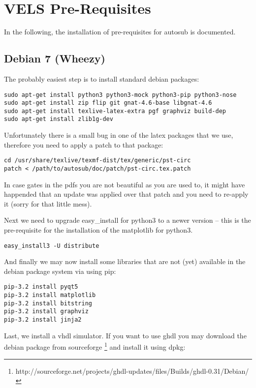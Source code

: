 \section{VELS Pre-Requisites} \label{system_prerequisites}

In the following, the installation of pre-requisites for autosub is documented.

\subsection{Debian 7 (Wheezy)}

The probably easiest step is to install standard debian packages:

\begin{verbatim}
sudo apt-get install python3 python3-mock python3-pip python3-nose
sudo apt-get install zip flip git gnat-4.6-base libgnat-4.6
sudo apt-get install texlive-latex-extra pgf graphviz build-dep
sudo apt-get install zlib1g-dev
\end{verbatim}

Unfortunately there is a small bug in one of the latex packages that we use,
therefore you need to apply a patch to that package:

\begin{verbatim}
cd /usr/share/texlive/texmf-dist/tex/generic/pst-circ
patch < /path/to/autosub/doc/patch/pst-circ.tex.patch
\end{verbatim}

In case gates in the pdfs you are not beautiful as you are used to, it might have
happended that an update was applied over that patch and you need to re-apply it (sorry for that little mess).


Next we need to upgrade easy\_install for python3 to a newer version -- this
is the pre-requisite for the installation of the matplotlib for python3.

\begin{verbatim}
easy_install3 -U distribute
\end{verbatim}

And finally we may now install some libraries that are not (yet) available in
the debian package system via using pip:

\begin{verbatim}
pip-3.2 install pyqt5
pip-3.2 install matplotlib
pip-3.2 install bitstring
pip-3.2 install graphviz
pip-3.2 install jinja2
\end{verbatim}

Last, we install a vhdl simulator. If you want to use ghdl you may download
the debian package from sourceforge \footnote{http://sourceforge.net/projects/ghdl-updates/files/Builds/ghdl-0.31/Debian/} and install it using dpkg:

